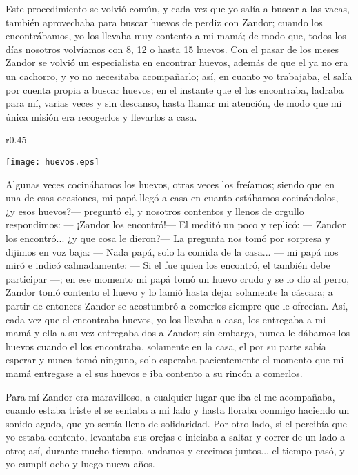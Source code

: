 Este procedimiento se volvió común, y cada vez que yo salía a buscar a las vacas, también aprovechaba para buscar huevos de perdiz con Zandor; cuando los encontrábamos,  yo los llevaba muy contento a mi mamá; de modo que, todos los días nosotros volvíamos con 8, 12 o hasta 15 huevos.
Con el pasar de los meses Zandor se volvió un especialista en encontrar huevos, además de que el ya no era un cachorro, y yo no necesitaba acompañarlo; así, en cuanto yo trabajaba, el salía por cuenta propia a buscar huevos; en el instante que el los encontraba, ladraba para mí, varias veces y sin descanso, hasta llamar mi atención, de modo que mi única misión era recogerlos y llevarlos a casa.
\ifdefined\EnableIncludeImages
\begin{wrapfigure}{r}{0.45\textwidth}
  \begin{center}
  \vspace{-20pt}
    \texttt{[image: huevos.eps]}
  \end{center}
  \vspace{-20pt}
\end{wrapfigure}
\fi
Algunas veces cocinábamos los huevos, otras veces los freíamos; siendo que en una de esas ocasiones, mi papá llegó a casa en cuanto estábamos cocinándolos, --- ¿y esos huevos?--- preguntó el, 
y nosotros contentos y llenos de orgullo respondimos: 
--- ¡Zandor los encontró!---
El meditó un poco y replicó: 
--- Zandor los encontró... ¿y que cosa le dieron?--- 
La pregunta nos tomó por sorpresa y dijimos en voz baja: 
--- Nada papá, solo la comida de la casa... --- mi papá nos miró e indicó calmadamente: 
--- Si el fue quien los encontró, el también debe participar ---;
en ese momento mi papá tomó un huevo crudo y se lo dio al perro, Zandor tomó contento el huevo y lo lamió hasta dejar solamente la cáscara; a partir de entonces Zandor se acostumbró a comerlos siempre que le ofrecían. Así, cada vez que el encontraba huevos, yo los llevaba a casa, los entregaba a mi mamá y ella a su vez entregaba dos a Zandor; sin embargo, nunca le dábamos los huevos cuando el los encontraba, solamente en la casa, el por su parte sabía esperar y nunca tomó ninguno, solo esperaba pacientemente el momento que mi mamá entregase a el sus huevos e iba contento a su rincón a comerlos.


Para mí Zandor era maravilloso, a cualquier lugar que iba el me acompañaba, cuando estaba triste el se sentaba a mi lado y hasta lloraba conmigo haciendo un sonido agudo, que yo sentía lleno de solidaridad.
Por otro lado, si el percibía que yo estaba contento, levantaba sus orejas e iniciaba a saltar y correr de un lado a otro; así, durante mucho tiempo, andamos y crecimos juntos... el tiempo pasó, y yo cumplí ocho y luego nueva años.

